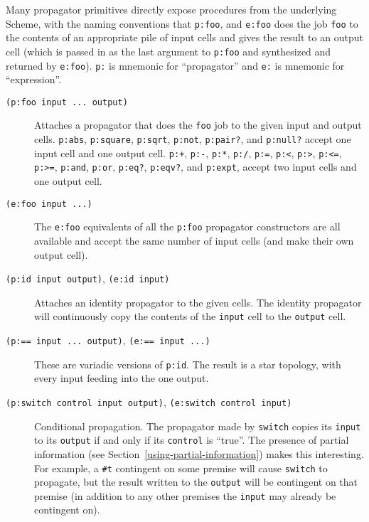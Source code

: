 \documentclass[12pt,letterpaper,english]{article}
\begin{document}
Many propagator primitives directly expose procedures from the
underlying Scheme, with the naming conventions that \texttt{p:foo}, and
\texttt{e:foo} does the job \texttt{foo} to the contents of an appropriate pile
of input cells and gives the result to an output cell (which is passed
in as the last argument to \texttt{p:foo} and synthesized and returned by
\texttt{e:foo}).  \texttt{p:} is mnemonic for ``propagator'' and \texttt{e:} is
mnemonic for ``expression''.
\begin{description}
\item[{\texttt{(p:foo input ... output)}}] \leavevmode 
Attaches a propagator that does the \texttt{foo} job to the given input
and output cells.  \texttt{p:abs}, \texttt{p:square}, \texttt{p:sqrt},
\texttt{p:not}, \texttt{p:pair?}, and \texttt{p:null?} accept one input cell and one
output cell.  \texttt{p:+}, \texttt{p:-}, \texttt{p:*}, \texttt{p:/}, \texttt{p:=}, \texttt{p:<},
\texttt{p:>}, \texttt{p:<=}, \texttt{p:>=}, \texttt{p:and}, \texttt{p:or}, \texttt{p:eq?},
\texttt{p:eqv?}, and \texttt{p:expt}, accept two input cells and one output
cell.

\item[{\texttt{(e:foo input ...)}}] \leavevmode 
The \texttt{e:foo} equivalents of all the \texttt{p:foo} propagator
constructors are all available and accept the same number of input
cells (and make their own output cell).

\item[{\texttt{(p:id input output)}, \texttt{(e:id input)}}] \leavevmode 
Attaches an identity propagator to the given cells.  The identity
propagator will continuously copy the contents of the \texttt{input} cell
to the \texttt{output} cell.

\item[{\texttt{(p:== input ... output)}, \texttt{(e:== input ...)}}] \leavevmode 
These are variadic versions of \texttt{p:id}.  The result is a
star topology, with every input feeding into the one output.

\item[{\texttt{(p:switch control input output)}, \texttt{(e:switch control input)}}] \leavevmode 
Conditional propagation.  The propagator made by \texttt{switch} copies
its \texttt{input} to its \texttt{output} if and only if its \texttt{control} is
``true''.  The presence of partial information (see Section~\ref{using-partial-information}) makes this
interesting.  For example, a \texttt{{\#}t} contingent on some premise will
cause \texttt{switch} to propagate, but the result written to the
\texttt{output} will be contingent on that premise (in addition to any
other premises the \texttt{input} may already be contingent on).


\end{description}
\end{document}
